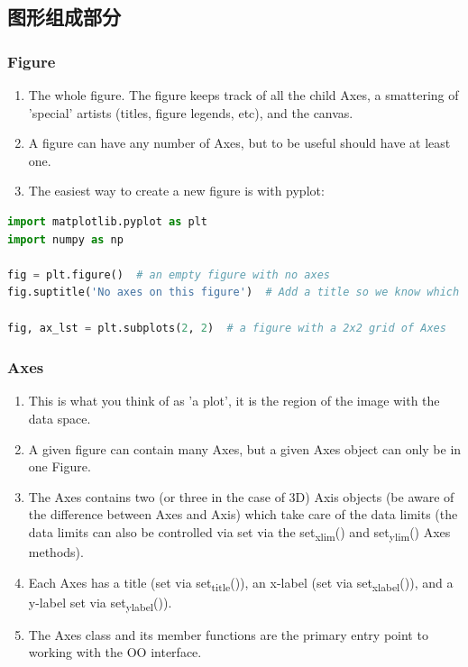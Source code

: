 \documentclass[UTF8,a4paper,12pt]{ctexart}  %
\providecommand{\tightlist}{\setlength{\itemsep}{0pt}\setlength{\parskip}{0pt}}
\begin{document}
\hypertarget{ux56feux5f62ux7ec4ux6210ux90e8ux5206}{%
\subsection{图形组成部分}\label{ux56feux5f62ux7ec4ux6210ux90e8ux5206}}

\hypertarget{figure}{%
\subsubsection{Figure}\label{figure}}

\begin{enumerate}
\def\labelenumi{\arabic{enumi}.}
\tightlist
\item
  The whole figure. The figure keeps track of all the child Axes, a
  smattering of 'special' artists (titles, figure legends, etc), and
  the canvas.
\item
  A figure can have any number of Axes, but to be useful should have
  at least one.
\item
  The easiest way to create a new figure is with pyplot:
\end{enumerate}

\begin{lstlisting}[language=Python]
import matplotlib.pyplot as plt
import numpy as np

fig = plt.figure()  # an empty figure with no axes
fig.suptitle('No axes on this figure')  # Add a title so we know which it is

fig, ax_lst = plt.subplots(2, 2)  # a figure with a 2x2 grid of Axes
\end{lstlisting}

\hypertarget{axes}{%
\subsubsection{Axes}\label{axes}}

\begin{enumerate}
\def\labelenumi{\arabic{enumi}.}
\tightlist
\item
  This is what you think of as 'a plot', it is the region of the
  image with the data space.
\item
  A given figure can contain many Axes, but a given Axes object can
  only be in one Figure.
\item
  The Axes contains two (or three in the case of 3D) Axis objects (be
  aware of the difference between Axes and Axis) which take care of
  the data limits (the data limits can also be controlled via set via
  the set\textsubscript{xlim}() and set\textsubscript{ylim}() Axes methods).
\item
  Each Axes has a title (set via set\textsubscript{title}()), an x-label (set via
  set\textsubscript{xlabel}()), and a y-label set via set\textsubscript{ylabel}()).
\item
  The Axes class and its member functions are the primary entry point
  to working with the OO interface.
\end{enumerate}
\end{document}
